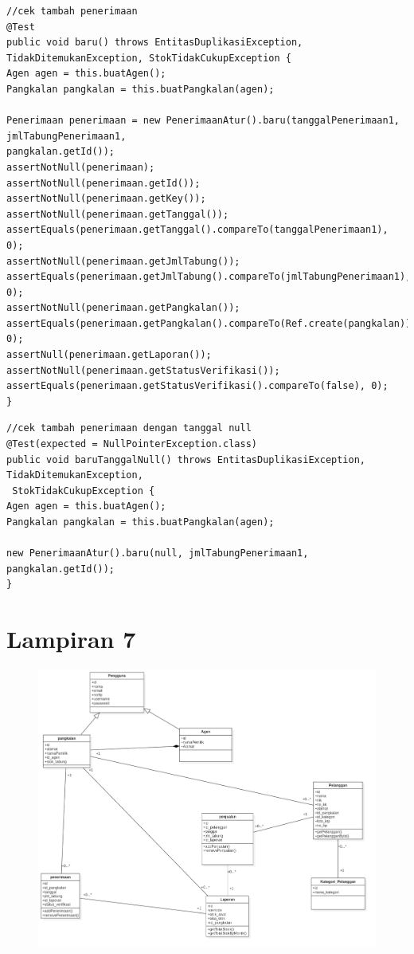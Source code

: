 \begin{lstlisting}[caption=Potongan kode Pengujian JUnit dengan kasus berhasil (\textit{test success}), label=testSuccess]
//cek tambah penerimaan
@Test
public void baru() throws EntitasDuplikasiException,
TidakDitemukanException, StokTidakCukupException {
Agen agen = this.buatAgen();
Pangkalan pangkalan = this.buatPangkalan(agen);

Penerimaan penerimaan = new PenerimaanAtur().baru(tanggalPenerimaan1, jmlTabungPenerimaan1, 
pangkalan.getId());
assertNotNull(penerimaan);
assertNotNull(penerimaan.getId());
assertNotNull(penerimaan.getKey());
assertNotNull(penerimaan.getTanggal());
assertEquals(penerimaan.getTanggal().compareTo(tanggalPenerimaan1), 0);
assertNotNull(penerimaan.getJmlTabung());
assertEquals(penerimaan.getJmlTabung().compareTo(jmlTabungPenerimaan1), 0);
assertNotNull(penerimaan.getPangkalan());
assertEquals(penerimaan.getPangkalan().compareTo(Ref.create(pangkalan)), 0);
assertNull(penerimaan.getLaporan());
assertNotNull(penerimaan.getStatusVerifikasi());
assertEquals(penerimaan.getStatusVerifikasi().compareTo(false), 0);
}
\end{lstlisting}

\begin{lstlisting}[caption=Potongan kode Pengujian JUnit dengan kasus gagal (\textit{test fail}), label=testFail]
//cek tambah penerimaan dengan tanggal null
@Test(expected = NullPointerException.class)
public void baruTanggalNull() throws EntitasDuplikasiException, TidakDitemukanException,
 StokTidakCukupException {
Agen agen = this.buatAgen();
Pangkalan pangkalan = this.buatPangkalan(agen);

new PenerimaanAtur().baru(null, jmlTabungPenerimaan1, pangkalan.getId());
}
\end{lstlisting}
\chapter*{Lampiran 7}
\begin{figure}[H]
	\includegraphics [angle=90,origin=c, width = 17cm]{gambar/model/class-diagram}
\end{figure}

